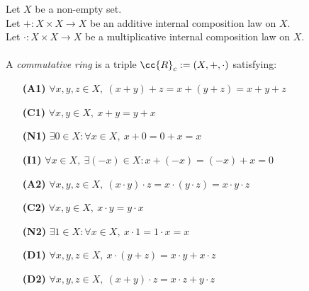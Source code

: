 \begin{definition-pre}
    \label{def:commutative_ring}
    Let \(X\) be a non-empty set. \\
    Let \(+: X\times X \to X\) be an additive internal composition law on \(X\). \\
    Let \(\cdot: X\times X \to X\) be a multiplicative internal composition law on \(X\). \\\\
    A \textit{commutative ring} is a triple \(\cc{R}_c:= (X, +, \cdot)\) satisfying:
    \begin{enumerate}
        \item [\textbf{(A1)}] \(\forall x,y,z\in X,\ (x+y)+z= x+(y+z) = x+y+z\)
        \item [\textbf{(C1)}] \(\forall x,y\in X,\ x+y = y+x\)
        \item [\textbf{(N1)}] \(\exists 0 \in X : \forall x \in X,\ x+0 = 0+x = x\)
        \item [\textbf{(I1)}] \(\forall x \in X,\ \exists (-x)\in X: x+(-x) = (-x)+x = 0\)
        \item [\textbf{(A2)}] \(\forall x,y,z\in X,\ (x\cdot y)\cdot z= x\cdot(y\cdot z) = x\cdot y\cdot z\)
        \item [\textbf{(C2)}] \(\forall x,y\in X,\ x\cdot y = y\cdot x\)
        \item [\textbf{(N2)}] \(\exists 1 \in X : \forall x \in X,\ x\cdot1 = 1\cdot x = x\)
        \item [\textbf{(D1)}] \(\forall x,y,z \in X,\ x\cdot(y+z)=x\cdot y+x\cdot z\)
        \item [\textbf{(D2)}] \(\forall x,y,z \in X,\ (x+y)\cdot z=x\cdot z+y\cdot z\)
    \end{enumerate}
\end{definition-pre}

